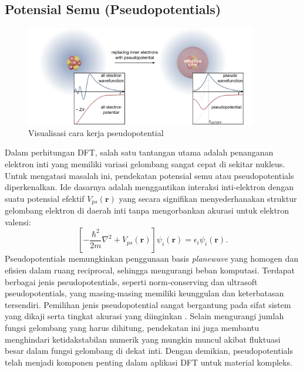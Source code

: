 \subsection{Potensial Semu (Pseudopotentials)}
\begin{figure}[h!]
    \centering
    \includegraphics[width=0.9\textwidth]{gambar/pseudopotential}
    \caption{Visualisasi cara kerja pseudopotential \cite{pseudopotential}}
    \label{fig:pseudopotential}
\end{figure}
Dalam perhitungan DFT, salah satu tantangan utama adalah penanganan elektron inti yang memiliki variasi gelombang sangat cepat di sekitar nukleus.
Untuk mengatasi masalah ini, pendekatan potensial semu atau pseudopotentials diperkenalkan.
Ide dasarnya adalah menggantikan interaksi inti-elektron dengan suatu potensial efektif \(V_{ps}(\mathbf{r})\) yang secara signifikan menyederhanakan struktur gelombang elektron di daerah inti tanpa mengorbankan akurasi untuk elektron valensi:
\begin{equation}
    \left[-\frac{\hbar^2}{2m}\nabla^2 + V_{ps}(\mathbf{r})\right]\psi_i(\mathbf{r}) = \epsilon_i \psi_i(\mathbf{r}).
\end{equation}
Pseudopotentials memungkinkan penggunaan basis \emph{planewave} yang homogen dan efisien dalam ruang reciprocal, sehingga mengurangi beban komputasi.
Terdapat berbagai jenis pseudopotentials, seperti norm-conserving dan ultrasoft pseudopotentials, yang masing-masing memiliki keunggulan dan keterbatasan tersendiri.
Pemilihan jenis pseudopotential sangat bergantung pada sifat sistem yang dikaji serta tingkat akurasi yang diinginkan \cite{Payne1992}.
Selain mengurangi jumlah fungsi gelombang yang harus dihitung, pendekatan ini juga membantu menghindari ketidakstabilan numerik yang mungkin muncul akibat fluktuasi besar dalam fungsi gelombang di dekat inti.
Dengan demikian, pseudopotentials telah menjadi komponen penting dalam aplikasi DFT untuk material kompleks.

